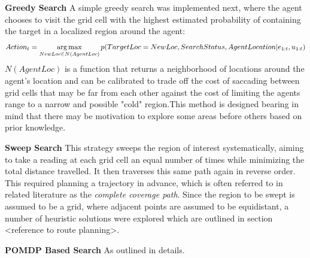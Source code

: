 \textbf{Greedy Search}
A simple greedy search was implemented next, where the agent chooses to visit the grid cell with the highest estimated probability of containing the target in a localized region around the agent:
\footnotesize
\[
Action_t = \operatorname*{arg\,max}_{NewLoc \in N(AgentLoc)}{p(TargetLoc = NewLoc, SearchStatus, AgentLocation| e_{1:t}, u_{1:t})}
\]
\normalsize
$N(AgentLoc)$ is a function that returns a neighborhood of locations around the agent's location and can be calibrated to trade off the cost of saccading between grid cells that may be far from each other against the cost of limiting the agents range to a narrow and possible "cold" region.This method is designed bearing in mind that there may be motivation to explore some areas before others based on prior knowledge. 


\textbf{Sweep Search}
This strategy sweeps the region of interest systematically, aiming to take a reading at each grid cell an equal number of times while minimizing the total distance travelled. It then traverses this same path again in reverse order. This required planning a trajectory in advance, which is often referred to in related literature as the \textit{complete coverage path}. Since the region to be swept is assumed to be a grid, where adjacent points are assumed to be equidistant, a number of heuristic solutions were explored which are outlined in section <reference to route planning>.\par

\textbf{POMDP Based Search} 
As outlined in 
details. \par

